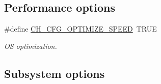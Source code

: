 \subsection*{Performance options}
\begin{DoxyCompactItemize}
\item 
\#define \hyperlink{group__config_gac7a7942b6c4ef2f79416971688a49c40}{C\+H\+\_\+\+C\+F\+G\+\_\+\+O\+P\+T\+I\+M\+I\+Z\+E\+\_\+\+S\+P\+E\+E\+D}~T\+R\+U\+E
\begin{DoxyCompactList}\small\item\em O\+S optimization. \end{DoxyCompactList}\end{DoxyCompactItemize}
\subsection*{Subsystem options}
